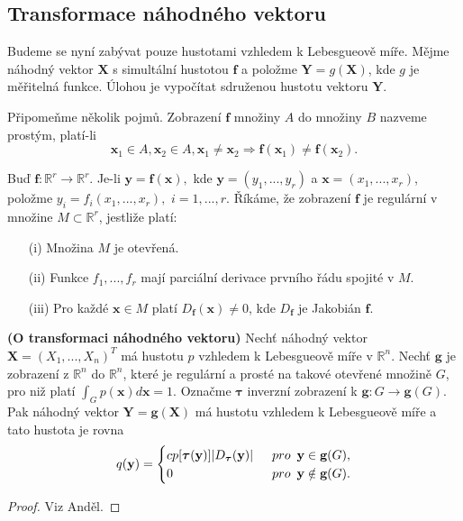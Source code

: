 \subsection{Transformace náhodného vektoru}
Budeme se nyní zabývat pouze hustotami vzhledem k Lebesgueově míře. Mějme náhodný vektor $\textbf{X}$ s simultální hustotou $\textbf{f}$ a položme $\textbf{Y} = g(\textbf{X})$, kde $g$ je měřitelná funkce. Úlohou je vypočítat sdruženou hustotu vektoru $\textbf{Y}$.

Připomeňme několik pojmů. Zobrazení $\mathbf{f}$ množiny $A$ do množiny $B$ nazveme prostým, platí-li
\begin{equation}
\textbf{x}_{1} \in A, \textbf{x}_{2} \in A, \textbf{x}_{1} \neq \textbf{x}_{2} \Longrightarrow \textbf{f}(\textbf{x}_{1}) \neq \textbf{f}(\textbf{x}_{2}).
\end{equation}

Buď $\textbf{f}: \mathbb{R}^{r} \longrightarrow \mathbb{R}^{r}.$ Je-li $\textbf{y} = \textbf{f}(\textbf{x}),$ kde $\textbf{y} = (y_{1}, ..., y_{r})$ a $\textbf{x} = (x_{1}, ..., x_{r})$, položme $y_{i} = f_{i}(x_{1}, ..., x_{r}),$ $i = 1, ..., r$. Říkáme, že zobrazení $\textbf{f}$ je regulární v množine $M \subset \mathbb{R}^{r}$, jestliže platí:
\begin{itemize}
\item[(i)] Množina $M$ je otevřená.
\item[(ii)] Funkce $f_{1}, ..., f_{r}$ mají parciální derivace prvního řádu spojité v $M$.
\item[(iii)] Pro každé $\textbf{x} \in M$ platí $D_{\mathbf{f}}(\textbf{x}) \neq 0$, kde $D_{\mathbf{f}}$ je Jakobián $\mathbf{f}$.
\end{itemize}

\begin{theorem}{\textbf{(O transformaci náhodného vektoru)}}
Nechť náhodný vektor $\textbf{X} = (X_{1}, ..., X_{n})^{T}$ má hustotu $p$ vzhledem k Lebesgueově míře v $\mathbb{R}^{n}$. Nechť $\textbf{g}$ je zobrazení z $\mathbb{R}^{n}$ do $\mathbb{R}^{n}$, které je regulární a prosté na takové otevřené množině $G$, pro niž platí $\int_{G} p(\textbf{x})d\textbf{x} = 1$. Označme $\bm{\tau}$ inverzní zobrazení k $\textbf{g}: G \longrightarrow \textbf{g}(G).$ Pak náhodný vektor $\textbf{Y} = \textbf{g}(\textbf{X})$ má hustotu vzhledem k Lebesgueově míře a tato hustota je rovna
\[
q(\textbf{y}) = 
\begin{cases}{c}
p[\bm{\tau}(\textbf{y})]|D_{\bm{\tau}}(\textbf{y})| & \enskip pro \enskip \textbf{y} \in \textbf{g}(G), \\
0 & \enskip pro \enskip \textbf{y} \notin \textbf{g}(G).
\end{cases}
\]
\end{theorem}
\begin{proof}
Viz Anděl.
\end{proof}
